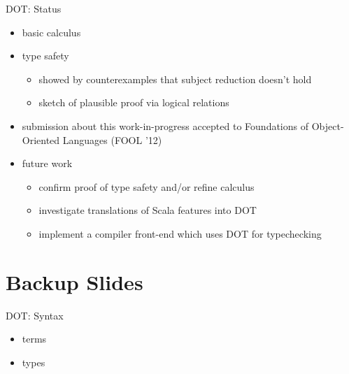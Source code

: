 \documentclass{beamer}
\begin{document}
\begin{frame}{DOT: Status}
\begin{itemize}
\item basic calculus
\item type safety
\begin{itemize}
\item showed by counterexamples that subject reduction doesn't hold
\item sketch of plausible proof via logical relations
\end{itemize}
\item submission about this work-in-progress accepted to Foundations
  of Object-Oriented Languages (FOOL '12)
\item future work
\begin{itemize}
\item confirm proof of type safety and/or refine calculus
\item investigate translations of Scala features into DOT
\item implement a compiler front-end which uses DOT for typechecking
\end{itemize}
\end{itemize}
\end{frame}

\section{Backup Slides}

\begin{frame}[fragile]{DOT: Syntax}
\begin{itemize}
\item terms
\item types
\end{itemize}
\end{frame}
\end{document}
